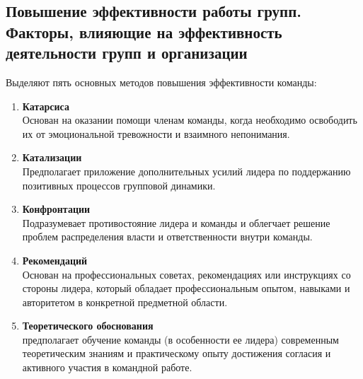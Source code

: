\documentclass[a4paper,12pt,oneside,final]{extarticle}
\numberwithin{equation}{section}
\begin{document}
\subsection{Повышение эффективности работы групп. Факторы, влияющие на эффективность деятельности групп и организации}
Выделяют пять основных методов повышения эффективности команды:
\begin{enumerate}
	\item \textbf{Катарсиса} \\ 
	Основан на оказании помощи членам команды, когда необходимо освободить их от эмоциональной тревожности и взаимного непонимания.
	\item \textbf{Катализации} \\ 
	Предполагает приложение дополнительных усилий лидера по поддержанию позитивных процессов групповой динамики.
	\item \textbf{Конфронтации} \\ 
	Подразумевает противостояние лидера и команды и облегчает решение проблем распределения власти и ответственности внутри команды.
	\item \textbf{Рекомендаций} \\ 
	Основан на профессиональных советах, рекомендациях или инструкциях со стороны лидера, который обладает профессиональным опытом, навыками и авторитетом в конкретной предметной области.
	\item \textbf{Теоретического обоснования} \\ 
	предполагает обучение команды (в особенности ее лидера) современным теоретическим знаниям и практическому опыту достижения согласия и активного участия в командной работе.
\end{enumerate}
\end{document}
